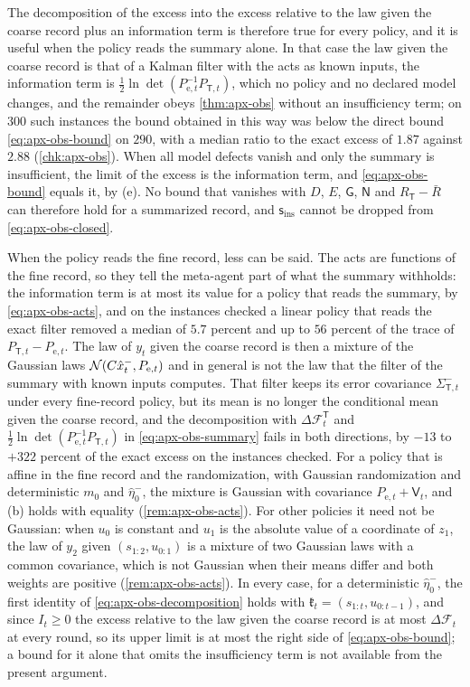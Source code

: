 The decomposition of the excess into the excess relative to the law given the coarse record plus an information term is therefore true for every policy, and it is useful when the policy reads the summary alone. In that case the law given the coarse record is that of a Kalman filter with the acts as known inputs, the information term is $\frac12\ln\det(P_{\mathrm e,t}^{-1}P_{\mathsf T,t})$, which no policy and no declared model changes, and the remainder obeys \cref{thm:apx-obs} without an insufficiency term; on $300$ such instances the bound obtained in this way was below the direct bound \eqref{eq:apx-obs-bound} on $290$, with a median ratio to the exact excess of $1.87$ against $2.88$ (\cref{chk:apx-obs}). When all model defects vanish and only the summary is insufficient, the limit of the excess is the information term, and \eqref{eq:apx-obs-bound} equals it, by (e). No bound that vanishes with $D$, $E$, $\mathsf G$, $\mathsf N$ and $R_{\mathsf T}-\bar R$ can therefore hold for a summarized record, and $\mathsf s_{\mathrm{ins}}$ cannot be dropped from \eqref{eq:apx-obs-closed}.

When the policy reads the fine record, less can be said. The acts are functions of the fine record, so they tell the meta-agent part of what the summary withholds: the information term is at most its value for a policy that reads the summary, by \eqref{eq:apx-obs-acts}, and on the instances checked a linear policy that reads the exact filter removed a median of $5.7$ percent and up to $56$ percent of the trace of $P_{\mathsf T,t}-P_{\mathrm e,t}$. The law of $y_t$ given the coarse record is then a mixture of the Gaussian laws $\mathcal{N}(C\hat x^-_t,P_{\mathrm e,t})$ and in general is not the law that the filter of the summary with known inputs computes. That filter keeps its error covariance $\Sigma^-_{\mathsf T,t}$ under every fine-record policy, but its mean is no longer the conditional mean given the coarse record, and the decomposition with $\Delta\mathcal F^{\mathsf T}_t$ and $\frac12\ln\det(P_{\mathrm e,t}^{-1}P_{\mathsf T,t})$ in \eqref{eq:apx-obs-summary} fails in both directions, by $-13$ to $+322$ percent of the exact excess on the instances checked. For a policy that is affine in the fine record and the randomization, with Gaussian randomization and deterministic $m_0$ and $\hat\eta^-_0$, the mixture is Gaussian with covariance $P_{\mathrm e,t}+\mathsf V_t$, and (b) holds with equality (\cref{rem:apx-obs-acts}). For other policies it need not be Gaussian: when $u_0$ is constant and $u_1$ is the absolute value of a coordinate of $z_1$, the law of $y_2$ given $(s_{1:2},u_{0:1})$ is a mixture of two Gaussian laws with a common covariance, which is not Gaussian when their means differ and both weights are positive (\cref{rem:apx-obs-acts}). In every case, for a deterministic $\hat\eta^-_0$, the first identity of \eqref{eq:apx-obs-decomposition} holds with $\mathfrak k_t=(s_{1:t},u_{0:t-1})$, and since $I_t\ge0$ the excess relative to the law given the coarse record is at most $\Delta\mathcal F_t$ at every round, so its upper limit is at most the right side of \eqref{eq:apx-obs-bound}; a bound for it alone that omits the insufficiency term is not available from the present argument.

